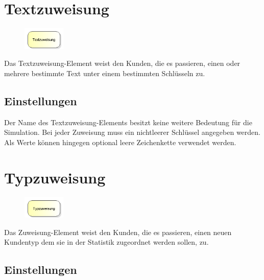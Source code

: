 \section{Textzuweisung}
\label{ref:ModelElementAssignString}

\begin{figure}
\vspace{-22pt}
\includegraphics[width=2cm]{imageModelElementAssignString.png}
\vspace{-22pt}
\end{figure}

Das Textzuweisung-Element weist den Kunden, die es passieren, einen oder mehrere bestimmte Text
unter einem bestimmten Schlüsseln zu.

\subsection*{Einstellungen}

Der Name des Textzuweisung-Elements besitzt keine weitere Bedeutung für die Simulation. Bei jeder
Zuweisung muss ein nichtleerer Schlüssel angegeben werden. Als Werte können hingegen optional
leere Zeichenkette verwendet werden.


\section{Typzuweisung}
\label{ref:ModelElementAssign}

\begin{figure}
\vspace{-22pt}
\includegraphics[width=2cm]{imageModelElementAssign.png}
\vspace{-22pt}
\end{figure}

Das Zuweisung-Element weist den Kunden, die es passieren, einen neuen Kundentyp dem sie in der Statistik zugeordnet werden sollen, zu.

\subsection*{Einstellungen}

